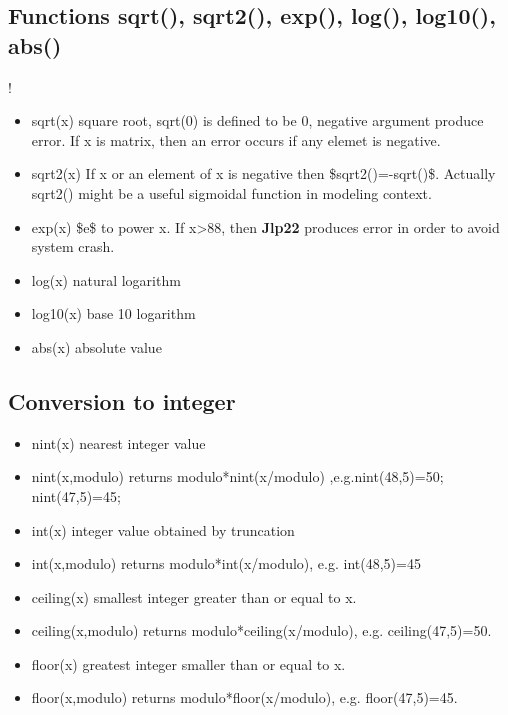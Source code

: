 \subsection{Functions \textcolor{VioletRed}{sqrt}(), \textcolor{VioletRed}{sqrt2}(), \textcolor{VioletRed}{exp}(), \textcolor{VioletRed}{log}(), \textcolor{VioletRed}{log10}(), \textcolor{VioletRed}{abs}()}
\label{arfu1}
!
\begin{itemize}
\item \textcolor{VioletRed}{sqrt}(x) square root, \textcolor{VioletRed}{sqrt}(0) is defined to be 0, negative argument produce error.
If {x} is matrix, then an error occurs if any elemet is negative.
\item \textcolor{VioletRed}{sqrt2}(x) If {x} or an element of {x} is negative then \$\textcolor{VioletRed}{sqrt2}()=-\textcolor{VioletRed}{sqrt}()\$. Actually \textcolor{VioletRed}{sqrt2}() might be a
useful sigmoidal function in modeling context.
\item \textcolor{VioletRed}{exp}(x) \$e\$ to power {x}. If {x}>88, then \textbf{Jlp22} produces error in order to avoid system
crash.
\item \textcolor{VioletRed}{log}(x) natural logarithm
\item \textcolor{VioletRed}{log10}(x) base 10 logarithm
\item \textcolor{VioletRed}{abs}(x) absolute value
\end{itemize}
\subsection{Conversion to integer}
\label{conversion}

\begin{itemize}
\item \textcolor{VioletRed}{nint}(x) nearest integer value
\item \textcolor{VioletRed}{nint}(x,modulo) returns modulo*nint(x/modulo) ,e.g.\textcolor{VioletRed}{nint}(48,5)=50; \textcolor{VioletRed}{nint}(47,5)=45;
\item \textcolor{VioletRed}{int}(x) integer value obtained by truncation
\item \textcolor{VioletRed}{int}(x,modulo) returns modulo*int(x/modulo), e.g. \textcolor{VioletRed}{int}(48,5)=45
\item \textcolor{VioletRed}{ceiling}(x) smallest integer greater than or equal to {x}.
\item \textcolor{VioletRed}{ceiling}(x,modulo) returns modulo*ceiling(x/modulo), e.g. \textcolor{VioletRed}{ceiling}(47,5)=50.
\item \textcolor{VioletRed}{floor}(x) greatest integer smaller than or equal to {x}.
\item \textcolor{VioletRed}{floor}(x,modulo) returns modulo*floor(x/modulo), e.g. \textcolor{VioletRed}{floor}(47,5)=45.
\end{itemize}
